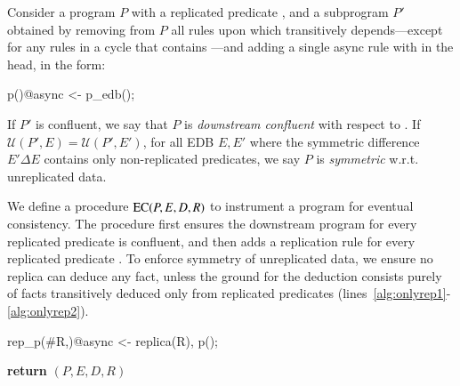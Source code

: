 \begin{definition}
Consider a \lang program $P$ with a replicated predicate , and a subprogram
$P'$ obtained by removing from $P$ all rules upon which  transitively
depends---except for any rules in a cycle that contains ---and adding a single async rule with  in the head, in the form:

\begin{Dedalus}
p()@async <- p_edb();
\end{Dedalus}
If $P'$ is confluent, we say that $P$ is {\em downstream confluent} with respect to .  
If $\mathcal{U}(P', E) = \mathcal{U}(P', E')$, for all EDB $E, E'$ where the symmetric difference $E' \Delta E$ contains only non-replicated predicates, we say $P$ is {\em symmetric} w.r.t. unreplicated data.
\end{definition}


We define a procedure $\textsc{EC}(P, E, D, R)$ to instrument a program for eventual consistency.  The procedure first ensures the downstream program for every replicated predicate is confluent, and then adds a replication rule for every replicated predicate .  To enforce symmetry of unreplicated data, we ensure no replica can deduce any fact, unless the ground for the deduction consists purely of facts transitively deduced only from replicated predicates (lines~\ref{alg:onlyrep1}-\ref{alg:onlyrep2}).

\begin{Dedalus}
rep_p(#R,)@async <- replica(R), p();
\end{Dedalus}

\begin{algorithmic}[1]
  \EndFor
   
  \Else
  \EndIf
  \EndIf
  \EndFor
   \label{alg:onlyrep1}
  \EndIf
  \EndFor \label{alg:onlyrep2}
  \State \textbf{return} $(P, E, D, R)$
  \EndProcedure
\end{algorithmic}

